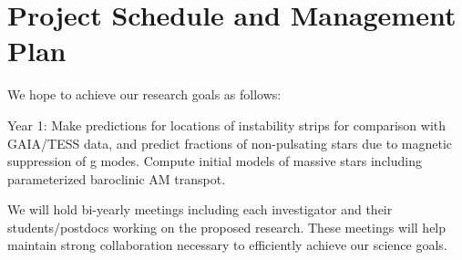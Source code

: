 \section{Project Schedule and Management Plan}

We hope to achieve our research goals as follows:

Year 1: Make predictions for locations of instability strips for comparison with GAIA/TESS data, and predict fractions of non-pulsating stars due to magnetic suppression of g modes. Compute initial models of massive stars including parameterized baroclinic AM transpot.  

We will  hold bi-yearly meetings including each investigator and their students/postdocs working on the proposed research. These meetings will help maintain strong collaboration necessary to efficiently achieve our science goals.
